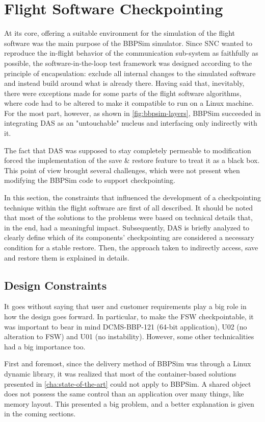 {
\setlength{\parindent}{2em}
\chapter{Flight Software Checkpointing}\label{cha:das-impl}
At its core, offering a suitable environment for the simulation of the flight software was the main purpose of the BBPSim simulator. Since \gls{SNC} wanted to reproduce the in-flight behavior of the communication sub-system as faithfully as possible, the software-in-the-loop test framework was designed according to the principle of encapsulation: exclude all internal changes to the simulated software and instead build around what is already there. Having said that, inevitably, there were exceptions made for some parts of the flight software algorithms, where code had to be altered to make it compatible to run on a Linux machine. For the most part, however, as shown in \autoref{fig:bbpsim-layers}, BBPSim succeeded in integrating \gls{DAS} as an "untouchable" nucleus and interfacing only indirectly with it.

The fact that DAS was supposed to stay completely permeable to modification forced the implementation of the save \& restore feature to treat it as a black box. This point of view brought several challenges, which were not present when modifying the BBPSim code to support checkpointing. 

In this section, the constraints that influenced the development of a checkpointing technique within the flight software are first of all described. It should be noted that most of the solutions to the problems were based on technical details that, in the end, had a meaningful impact. Subsequently, \gls{DAS} is briefly analyzed to clearly define which of its components' checkpointing are considered a necessary condition for a stable restore. Then, the approach taken to indirectly access, save and restore them is explained in details.

\section{Design Constraints}
It goes without saying that user and customer requirements play a big role in how the design goes forward. In particular, to make the \gls{FSW} checkpointable, it was important to bear in mind DCMS-BBP-121 (64-bit application), U02 (no alteration to FSW) and U01 (no instability). However, some other technicalities had a big importance too.

First and foremost, since the delivery method of BBPSim was through a Linux dynamic library, it was realized that most of the container-based solutions presented in \autoref{cha:state-of-the-art} could not apply to BBPSim. A shared object does not possess the same control than an application over many things, like memory layout. This presented a big problem, and a better explanation is given in the coming sections.

}
